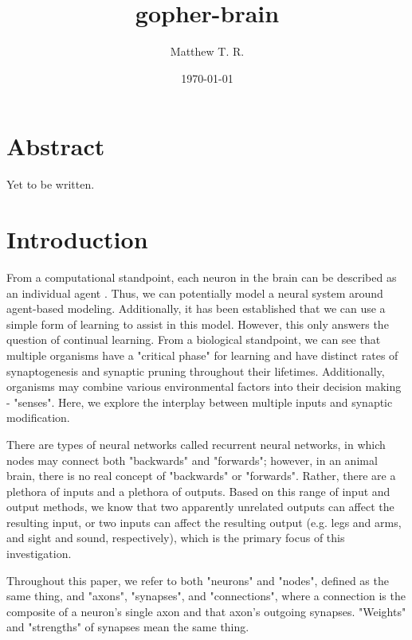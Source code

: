 \documentclass[12pt]{article}
\begin{document}
\title{gopher-brain}
\author{Matthew T. R.}
\date{\today{}}
\maketitle{}

\newpage

\tableofcontents{}

\newpage

\section*{Abstract} \label{abstract}

Yet to be written.

\section{Introduction} \label{intro}

From a computational standpoint, each neuron in the brain can be described as an individual agent \cite{agentbased}.  Thus, we can potentially model a neural system around agent-based modeling.  Additionally, it has been established that we can use a simple form of learning \cite{agentbased} to assist in this model.  However, this only answers the question of continual learning.  From a biological standpoint, we can see that multiple organisms have a "critical phase" for learning \cite{neurodev} and have distinct rates of synaptogenesis and synaptic pruning throughout their lifetimes.  Additionally, organisms may combine various environmental factors into their decision making - "senses".  Here, we explore the interplay between multiple inputs and synaptic modification.

There are types of neural networks called recurrent neural networks, in which nodes may connect both "backwards" and "forwards"; however, in an animal brain, there is no real concept of "backwards" or "forwards".  Rather, there are a plethora of inputs and a plethora of outputs.  Based on this range of input and output methods, we know that two apparently unrelated outputs can affect the resulting input, or two inputs can affect the resulting output (e.g. legs and arms, and sight and sound, respectively), which is the primary focus of this investigation.

Throughout this paper, we refer to both "neurons" and "nodes", defined as the same thing, and "axons", "synapses", and "connections", where a connection is the composite of a neuron's single axon and that axon's outgoing synapses.  "Weights" and "strengths" of synapses mean the same thing.
\end{document}

